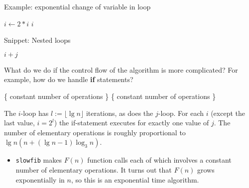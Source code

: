 \begin{Boxample}[4]
\begin{algorithm}[H]
  \caption{Example: exponential change of variable in loop
    \label{alg:runtime1}}
\begin{algorithmic}[0]
\State {}
\State $i \gets 2*i$
\State {} $i$
\EndWhile
\end{algorithmic}
\end{algorithm}

\end{Boxample}

\begin{Boxample}[4]
\begin{algorithm}[H]
  \caption{Snippet: Nested loops
    \label{alg:nestloop}}
\begin{algorithmic}[0]
\State {} $i+j$
\EndFor
\EndFor
\end{algorithmic}
\end{algorithm}
\end{Boxample}

What do we do if the control flow of the algorithm is more complicated? For example, how do we handle \textbf{if} statements?

\begin{Boxample}[6]
\begin{algorithm}[H]
\begin{algorithmic}[0]
\State \{ constant number of operations \} 
\EndFor
\Else
{} 
\State \{ constant number of operations \}
\EndFor
\EndIf
\EndFor
\EndFor
\end{algorithmic}
\end{algorithm}
\end{Boxample}

The $i$-loop has $l:=\lfloor \lg n \rfloor$ iterations, as does the $j$-loop. 
For each $i$ (except the last value, $i = 2^l$) the if-statement executes for 
exactly one value of $j$. The number of elementary operations is roughly 
proportional to $\lg n (n + (\lg n - 1)\log_3 n)$. 
\fi



\begin{frame}
\begin{itemize}[<+->]
\item \texttt{slowfib} makes $F(n)$ function calls each of which involves a
constant number of elementary operations. It turns out that $F(n)$ grows
exponentially in $n$, so this is an \alert{exponential time algorithm}.
\end{itemize}
\end{frame}
\fi


